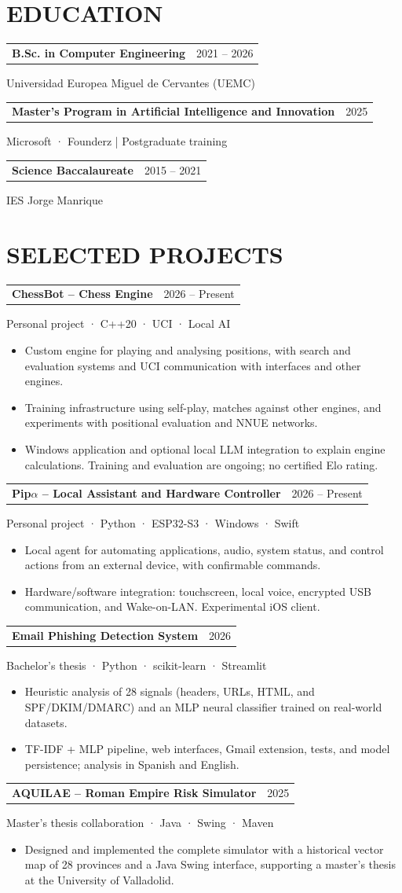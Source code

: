 \documentclass[10pt,a4paper]{article}
\makeatletter
\newcommand{\entry}[3]{\noindent\begin{tabularx}{\linewidth}{@{}Xr@{}}\textbf{#1}&{\small\color{muted}#2}\end{tabularx}\par{\small\color{muted}#3}\par}
\makeatother
\begin{document}
\section*{EDUCATION}
\entry{B.Sc. in Computer Engineering}{2021 -- 2026}{Universidad Europea Miguel de Cervantes (UEMC)}\vspace{3pt}
\entry{Master’s Program in Artificial Intelligence and Innovation}{2025}{Microsoft · Founderz | Postgraduate training}\vspace{3pt}
\entry{Science Baccalaureate}{2015 -- 2021}{IES Jorge Manrique}\vspace{3pt}
\newpage
\section*{SELECTED PROJECTS}
\entry{ChessBot -- Chess Engine}{2026 -- Present}{Personal project · C++20 · UCI · Local AI}
\begin{itemize}
\item Custom engine for playing and analysing positions, with search and evaluation systems and UCI communication with interfaces and other engines.
\item Training infrastructure using self-play, matches against other engines, and experiments with positional evaluation and NNUE networks.
\item Windows application and optional local LLM integration to explain engine calculations. Training and evaluation are ongoing; no certified Elo rating.
\end{itemize}
\entry{Pip$\alpha$ -- Local Assistant and Hardware Controller}{2026 -- Present}{Personal project · Python · ESP32-S3 · Windows · Swift}
\begin{itemize}
\item Local agent for automating applications, audio, system status, and control actions from an external device, with confirmable commands.
\item Hardware/software integration: touchscreen, local voice, encrypted USB communication, and Wake-on-LAN. Experimental iOS client.
\end{itemize}
\entry{Email Phishing Detection System}{2026}{Bachelor’s thesis · Python · scikit-learn · Streamlit}
\begin{itemize}
\item Heuristic analysis of 28 signals (headers, URLs, HTML, and SPF/DKIM/DMARC) and an MLP neural classifier trained on real-world datasets.
\item TF-IDF + MLP pipeline, web interfaces, Gmail extension, tests, and model persistence; analysis in Spanish and English.
\end{itemize}
\entry{AQUILAE -- Roman Empire Risk Simulator}{2025}{Master’s thesis collaboration · Java · Swing · Maven}
\begin{itemize}
\item Designed and implemented the complete simulator with a historical vector map of 28 provinces and a Java Swing interface, supporting a master’s thesis at the University of Valladolid.
\end{itemize}
\end{document}
